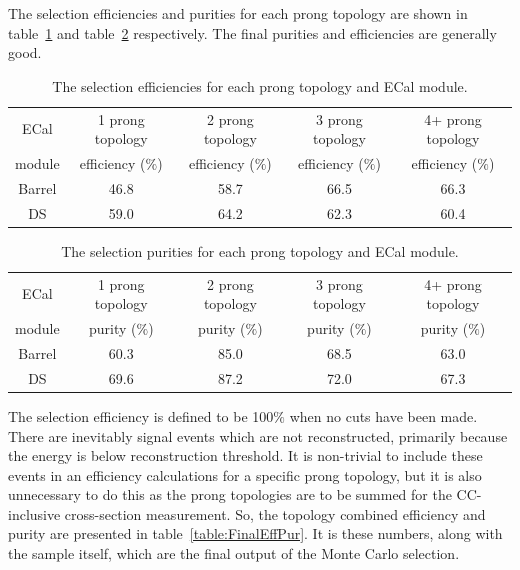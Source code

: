 \newline
The selection efficiencies and purities for each prong topology are shown in table~\ref{table:SelEfficiency} and table~\ref{table:SelPurity} respectively.  The final purities and efficiencies are generally good.  
\begin{table}
  \begin{tabular}{ c c c c c }
    ECal & 1 prong topology & 2 prong topology & 3 prong topology & 4+ prong topology \\
    module & efficiency ($\%$)& efficiency ($\%$)& efficiency ($\%$)& efficiency ($\%$) \\ \hline \hline
    Barrel & 46.8 & 58.7 & 66.5 & 66.3 \\
    DS & 59.0 & 64.2 & 62.3 & 60.4\\
  \end{tabular}
  \caption{The selection efficiencies for each prong topology and ECal module.}
  \label{table:SelEfficiency}
\end{table}
\begin{table}
  \begin{tabular}{ c c c c c }
    ECal & 1 prong topology & 2 prong topology & 3 prong topology & 4+ prong topology \\
    module & purity ($\%$)& purity ($\%$)& purity ($\%$)& purity ($\%$) \\ \hline \hline
    Barrel & 60.3 & 85.0 & 68.5 & 63.0\\
    DS & 69.6 & 87.2 & 72.0 & 67.3\\
  \end{tabular}
  \caption{The selection purities for each prong topology and ECal module.}
  \label{table:SelPurity}
\end{table}
\newline
\newline
The selection efficiency is defined to be 100$\%$ when no cuts have been made.  There are inevitably signal events which are not reconstructed, primarily because the energy is below reconstruction threshold.  It is non-trivial to include these events in an efficiency calculations for a specific prong topology, but it is also unnecessary to do this as the prong topologies are to be summed for the CC-inclusive cross-section measurement.  So, the topology combined efficiency and purity are presented in table~\ref{table:FinalEffPur}.  It is these numbers, along with the sample itself, which are the final output of the Monte Carlo selection.
